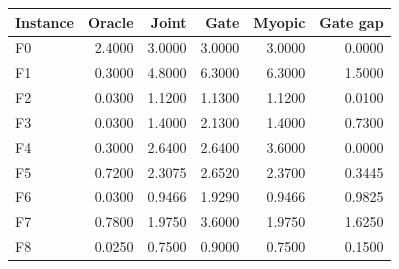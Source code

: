 \begin{tabular}{lrrrrr}
\toprule
Instance & Oracle & Joint & Gate & Myopic & Gate gap\\
\midrule
F0 & 2.4000 & 3.0000 & 3.0000 & 3.0000 & 0.0000\\
F1 & 0.3000 & 4.8000 & 6.3000 & 6.3000 & 1.5000\\
F2 & 0.0300 & 1.1200 & 1.1300 & 1.1200 & 0.0100\\
F3 & 0.0300 & 1.4000 & 2.1300 & 1.4000 & 0.7300\\
F4 & 0.3000 & 2.6400 & 2.6400 & 3.6000 & 0.0000\\
F5 & 0.7200 & 2.3075 & 2.6520 & 2.3700 & 0.3445\\
F6 & 0.0300 & 0.9466 & 1.9290 & 0.9466 & 0.9825\\
F7 & 0.7800 & 1.9750 & 3.6000 & 1.9750 & 1.6250\\
F8 & 0.0250 & 0.7500 & 0.9000 & 0.7500 & 0.1500\\
\bottomrule
\end{tabular}
